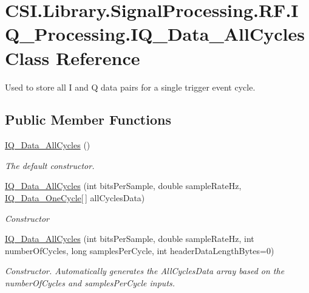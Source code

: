 \hypertarget{class_c_s_i_1_1_library_1_1_signal_processing_1_1_r_f_1_1_i_q___processing_1_1_i_q___data___all_cycles}{}\section{C\+S\+I.\+Library.\+Signal\+Processing.\+R\+F.\+I\+Q\+\_\+\+Processing.\+I\+Q\+\_\+\+Data\+\_\+\+All\+Cycles Class Reference}
\label{class_c_s_i_1_1_library_1_1_signal_processing_1_1_r_f_1_1_i_q___processing_1_1_i_q___data___all_cycles}


Used to store all I and Q data pairs for a single trigger event cycle.  


\subsection*{Public Member Functions}
\begin{DoxyCompactItemize}
\item 
\mbox{\hyperlink{class_c_s_i_1_1_library_1_1_signal_processing_1_1_r_f_1_1_i_q___processing_1_1_i_q___data___all_cycles_a8f408e8ef6c36c9a96a1ae949dc9a83e}{I\+Q\+\_\+\+Data\+\_\+\+All\+Cycles}} ()
\begin{DoxyCompactList}\small\item\em The default constructor. \end{DoxyCompactList}\item 
\mbox{\hyperlink{class_c_s_i_1_1_library_1_1_signal_processing_1_1_r_f_1_1_i_q___processing_1_1_i_q___data___all_cycles_a9ddb0cf4fc1e79a04dada037093f9404}{I\+Q\+\_\+\+Data\+\_\+\+All\+Cycles}} (int bits\+Per\+Sample, double sample\+Rate\+Hz, \mbox{\hyperlink{class_c_s_i_1_1_library_1_1_signal_processing_1_1_r_f_1_1_i_q___processing_1_1_i_q___data___one_cycle}{I\+Q\+\_\+\+Data\+\_\+\+One\+Cycle}}\mbox{[}$\,$\mbox{]} all\+Cycles\+Data)
\begin{DoxyCompactList}\small\item\em Constructor \end{DoxyCompactList}\item 
\mbox{\hyperlink{class_c_s_i_1_1_library_1_1_signal_processing_1_1_r_f_1_1_i_q___processing_1_1_i_q___data___all_cycles_af16d9d0e758eaab0cae53ebaccf300c3}{I\+Q\+\_\+\+Data\+\_\+\+All\+Cycles}} (int bits\+Per\+Sample, double sample\+Rate\+Hz, int number\+Of\+Cycles, long samples\+Per\+Cycle, int header\+Data\+Length\+Bytes=0)
\begin{DoxyCompactList}\small\item\em Constructor. Automatically generates the All\+Cycles\+Data array based on the number\+Of\+Cycles and samples\+Per\+Cycle inputs. \end{DoxyCompactList}\end{DoxyCompactItemize}
